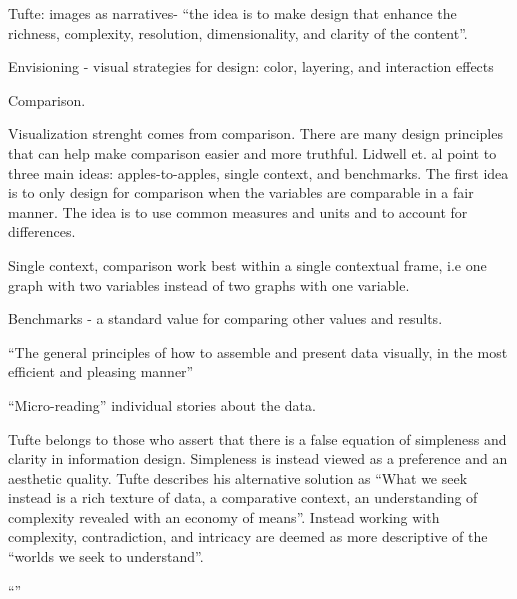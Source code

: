 Tufte: images as narratives- ``the idea is to make design that enhance the richness, complexity, resolution, dimensionality, and clarity of the content''\cite[p.~10]{Tufte1997Visual}. 

Envisioning - visual strategies for design: color, layering, and interaction effects

Comparison.

Visualization strenght comes from comparison. There are many design principles that can help make comparison easier and more truthful. Lidwell et. al point to three main ideas: apples-to-apples, single context, and benchmarks\cite[p.~43]{Lidwell2010Universal}. The first idea is to only design for comparison when the variables are comparable in a fair manner. The idea is to use common measures and units and to account for differences. 

Single context, comparison work best within a single contextual frame, i.e one graph with two variables instead of two graphs with one variable. 


Benchmarks - a standard value for comparing other values and results\cite[p.~43]{Lidwell2010Universal}. 

\cite[p]{}
``The general principles of how to assemble and present data visually, in the most efficient and pleasing manner''

``Micro-reading'' individual stories about the data. 

Tufte belongs to those who assert that there is a false equation of simpleness and clarity in information design. Simpleness is instead viewed as a preference and an aesthetic quality. Tufte describes his alternative solution as ``What we seek instead is a rich texture of data, a comparative context, an understanding of complexity revealed with an economy of means''\cite[p.~51]{Tufte1990Envisioning}. Instead working with complexity, contradiction, and intricacy are deemed as more descriptive of the ``worlds we seek to understand''\cite[p.~51]{Tufte1990Envisioning}. 

``''